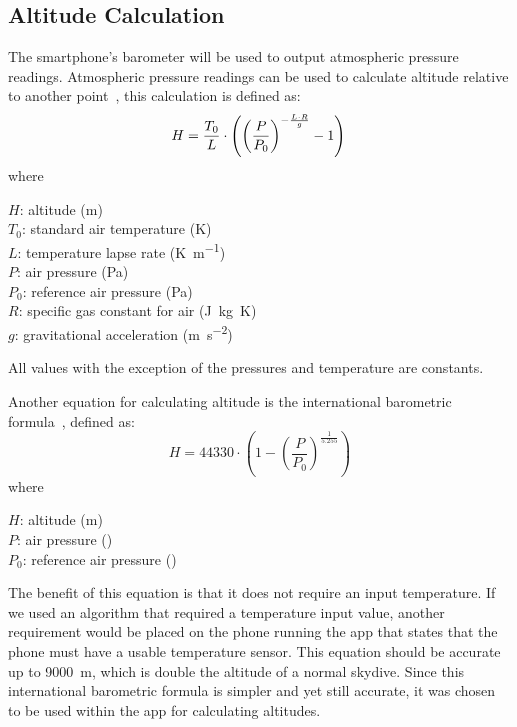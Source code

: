\subsection{Altitude Calculation}
The smartphone's barometer will be used to output atmospheric pressure readings. Atmospheric pressure readings can be used to calculate altitude relative to another point~\cite{he_atmospheric_2012, liu_beyond_2014}, this calculation is defined as:
\begin{equation}\label{eq:altitude-calculation}
  H = \frac{T_0}{L} \cdot \left({\left(\frac{P}{P_0}\right)}^{-\frac{L \cdot R}{g}} - 1\right) \\
\end{equation}
where
\begin{description}
  $H$: altitude (\si{\metre}) \\
  $T_0$: standard air temperature (\si{\kelvin}) \\
  $L$: temperature lapse rate (\si{\kelvin\per\metre}) \\
  $P$: air pressure (\si{\pascal}) \\
  $P_0$: reference air pressure (\si{\pascal}) \\
  $R$: specific gas constant for air (\si{\joule\kilogram\kelvin}) \\
  $g$: gravitational acceleration (\si{\metre\per\second\squared})
\end{description}

All values with the exception of the pressures and temperature are constants.

Another equation for calculating altitude is the international barometric formula~\cite{bosch_bmp180:_2018}, defined as:
\begin{equation}\label{eq:barometric-fomula}
  H = 44330 \cdot \left(1 - {\left(\frac{P}{P_0}\right)}^{\frac{1}{5.255}}\right)
\end{equation}
where
\begin{description}
  $H$: altitude (\si{\metre}) \\
  $P$: air pressure (\si{\hPa}) \\
  $P_0$: reference air pressure (\si{\hPa})
\end{description}

The benefit of this equation is that it does not require an input temperature. If we used an algorithm that required a temperature input value, another requirement would be placed on the phone running the app that states that the phone must have a usable temperature sensor. This equation should be accurate up to \SI{9000}{\metre}, which is double the altitude of a normal skydive. Since this international barometric formula is simpler and yet still accurate, it was chosen to be used within the app for calculating altitudes.

